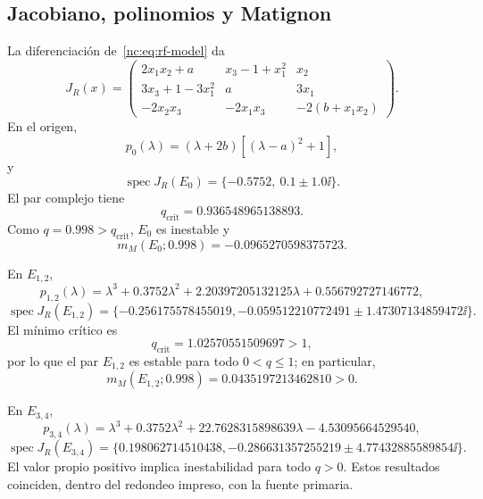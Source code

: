 \subsection{Jacobiano, polinomios y Matignon}

La diferenciación de~\eqref{nc:eq:rf-model} da
\begin{equation}
 J_R(x)=
 \begin{pmatrix}
 2x_1x_2+a&x_3-1+x_1^2&x_2\\
 3x_3+1-3x_1^2&a&3x_1\\
 -2x_2x_3&-2x_1x_3&-2(b+x_1x_2)
 \end{pmatrix}.
 \label{nc:eq:rf-jacobian}
\end{equation}
En el origen,
\begin{equation}
 p_0(\lambda)=(\lambda+2b)\left[(\lambda-a)^2+1\right],
\end{equation}
y
\begin{equation}
 \operatorname{spec}J_R(E_0)=
 \{-0.5752,\ 0.1\pm1.0\ii\}.
\end{equation}
El par complejo tiene
\begin{equation}
 q_{\mathrm{crit}}=0.936548965138893.
\end{equation}
Como \(q=0.998>q_{\mathrm{crit}}\), \(E_0\) es inestable y
\begin{equation}
 m_M(E_0;0.998)=-0.0965270598375723.
\end{equation}

En \(E_{1,2}\),
\begin{equation}
 p_{1,2}(\lambda)=
 \lambda^3+0.3752\lambda^2
 +2.20397205132125\lambda+0.556792727146772,
\end{equation}
\begin{equation}
 \operatorname{spec}J_R(E_{1,2})=
 \{-0.256175578455019,
 -0.059512210772491\pm1.47307134859472\ii\}.
\end{equation}
El mínimo crítico es
\begin{equation}
 q_{\mathrm{crit}}=1.02570551509697>1,
\end{equation}
por lo que el par \(E_{1,2}\) es estable para todo \(0<q\leq1\); en particular,
\begin{equation}
 m_M(E_{1,2};0.998)=0.0435197213462810>0.
\end{equation}

En \(E_{3,4}\),
\begin{equation}
 p_{3,4}(\lambda)=
 \lambda^3+0.3752\lambda^2
 +22.7628315898639\lambda-4.53095664529540,
\end{equation}
\begin{equation}
 \operatorname{spec}J_R(E_{3,4})=
 \{0.198062714510438,
 -0.286631357255219\pm4.77432885589854\ii\}.
\end{equation}
El valor propio positivo implica inestabilidad para todo \(q>0\). Estos
resultados coinciden, dentro del redondeo impreso, con la fuente primaria.

